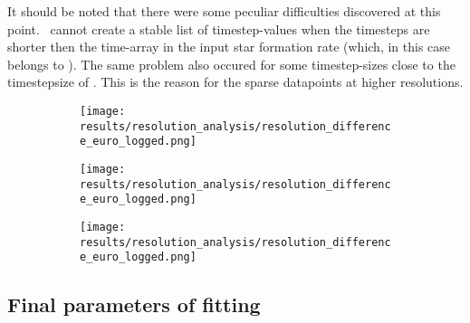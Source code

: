 It should be noted that there were some peculiar difficulties discovered at this point. \omegamodel\ cannot create a stable list of timestep-values when the timesteps are shorter then the time-array in the input star formation rate (which, in this case belongs to \eris). The same problem also occured for some timestep-sizes close to the timestepsize of \eris.
This is the reason for the sparse datapoints at higher resolutions.

\setlength{\subfigwidth}{0.3\textwidth}
\begin{figure}
  \centering
  \begin{subfigure}{\subfigwidth}
    \texttt{[image: results/resolution\_analysis/resolution\_difference\_euro\_logged.png]}
    \caption{\label{fig:fit-res-euro}}
  \end{subfigure}
  \begin{subfigure}{\subfigwidth}
    \texttt{[image: results/resolution\_analysis/resolution\_difference\_euro\_logged.png]}
    \caption{\label{fig:fit-res-euro}}
  \end{subfigure}
  \begin{subfigure}{\subfigwidth}
    \texttt{[image: results/resolution\_analysis/resolution\_difference\_euro\_logged.png]}
    \caption{\label{fig:fit-res-euro}}
  \end{subfigure}
\end{figure}

\FloatBarrier
\subsection{Final parameters of fitting}

